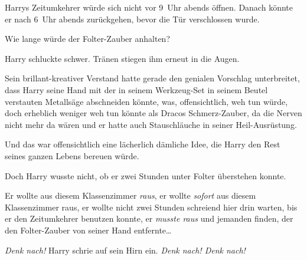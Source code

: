 Harrys Zeitumkehrer würde sich nicht vor 9~Uhr abends öffnen. Danach könnte er nach 6~Uhr abends zurückgehen, bevor die Tür verschlossen wurde.

Wie lange würde der Folter-Zauber anhalten?

Harry schluckte schwer. Tränen stiegen ihm erneut in die Augen.

Sein brillant-kreativer Verstand hatte gerade den genialen Vorschlag unterbreitet, dass Harry seine Hand mit der in seinem Werkzeug-Set in seinem Beutel verstauten Metallsäge abschneiden könnte, was, offensichtlich, weh tun würde, doch erheblich weniger weh tun könnte als Dracos Schmerz-Zauber, da die Nerven nicht mehr da wären und er hatte auch Stauschläuche in seiner Heil-Ausrüstung.

Und das war offensichtlich eine lächerlich dämliche Idee, die Harry den Rest seines ganzen Lebens bereuen würde.

Doch Harry wusste nicht, ob er zwei Stunden unter Folter überstehen konnte.

Er wollte aus diesem Klassenzimmer \emph{raus}, er wollte \emph{sofort} aus diesem Klassenzimmer raus, er wollte nicht zwei Stunden schreiend hier drin warten, bis er den Zeitumkehrer benutzen konnte, er \emph{musste raus} und jemanden finden, der den Folter-Zauber von seiner Hand entfernte…

\emph{Denk nach!} Harry schrie auf sein Hirn ein. \emph{Denk nach! Denk nach!}

\later

